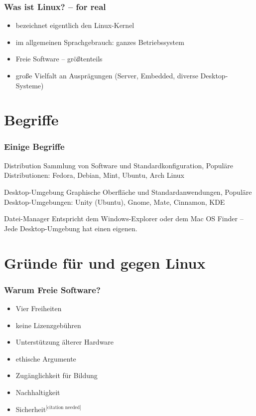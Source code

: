 \documentclass[t]{beamer}
\begin{document}
\begin{frame}
  \frametitle{Was ist Linux? – for real}
  \begin{itemize}
  \item bezeichnet eigentlich den Linux-Kernel
  \item im allgemeinen Sprachgebrauch: ganzes Betriebssystem
  \item Freie Software – größtenteils
  \item große Vielfalt an Ausprägungen (Server, Embedded, diverse
    Desktop-Systeme)
  \end{itemize}
\end{frame}


\section{Begriffe}
\begin{frame}
  \frametitle{Einige Begriffe}
  \begin{block}{Distribution}
    Sammlung von Software und Standardkonfiguration, Populäre
    Distributionen: Fedora, Debian, Mint, Ubuntu, Arch Linux
  \end{block}
  \begin{block}{Desktop-Umgebung}
    Graphische Oberfläche und Standardanwendungen, Populäre
    Desktop-Umgebungen: Unity (Ubuntu), Gnome, Mate, Cinnamon, KDE
  \end{block}
  \begin{block}{Datei-Manager}
    Entspricht dem Windows-Explorer oder dem Mac OS Finder – Jede
    Desktop-Umgebung hat einen eigenen.
  \end{block}
\end{frame}

\section{Gründe für und gegen Linux}
\begin{frame}
  \frametitle{Warum Freie Software?}
  \begin{itemize}
  \item Vier Freiheiten
  \item keine Lizenzgebühren
  \item Unterstützung älterer Hardware
  \item ethische Argumente
  \item Zugänglichkeit für Bildung
  \item Nachhaltigkeit
  \item Sicherheit${}^\text{[citation needed]}$
  \end{itemize}
\end{frame}
\end{document}
